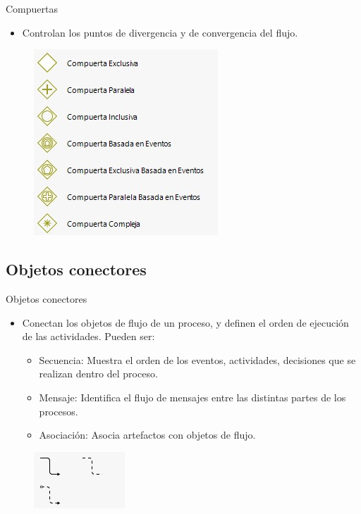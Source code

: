 \begin{frame}{Compuertas}
    \begin{itemize}
        \item Controlan los puntos de divergencia y de convergencia del flujo.
    \end{itemize}
    \begin{figure}
        \centering
        \includegraphics[scale=0.8]{images/gateway.jpg}
    \end{figure}
\end{frame}

\subsection{Objetos conectores}

\begin{frame}{Objetos conectores}
    \begin{itemize}
        \item Conectan los objetos de flujo de un proceso, y definen el orden de ejecución de las actividades. Pueden ser:
        \begin{itemize}
            \item Secuencia: Muestra el orden de los eventos, actividades, decisiones que se realizan dentro del proceso.
            \item Mensaje: Identifica el flujo de mensajes entre las distintas partes de los procesos.
            \item Asociación: Asocia artefactos con objetos de flujo.
        \end{itemize}
    \end{itemize}
    \begin{figure}
        \centering
        \includegraphics[scale=0.8]{images/flows.jpg}
    \end{figure}
\end{frame}

